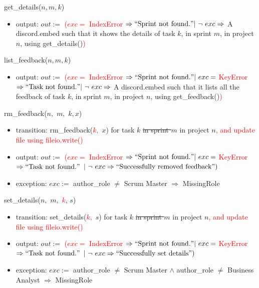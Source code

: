 \documentclass[12pt, titlepage]{article}
\begin{document}
\noindent get\_details($n, m, k$)
\begin{itemize}
    \item output: $out :=$ \textcolor{red}{($exc =$ IndexError $\Rightarrow ``\text{Sprint not found.}"\\ |\ \lnot\ exc \Rightarrow$} A discord.embed such that it shows the details of task $k$, in sprint $m$, in project $n$, using get\_details()\textcolor{red}{)}
\end{itemize}

\noindent list\_feedback($n, m, k$)
\begin{itemize}
    \item output: $out :=$ \textcolor{red}{($exc =$ IndexError $\Rightarrow ``\text{Sprint not found.}"\\ |\ exc =$ KeyError $\Rightarrow ``\text{Task not found.}"\\ |\ \lnot\ exc \Rightarrow$} A discord.embed such that it lists all the feedback of task $k$, in sprint $m$, in project $n$, using get\_feedback()\textcolor{red}{)}
\end{itemize}

\noindent rm\_feedback($n,$ \sout{$m,$} $k, x$)
\begin{itemize}
    \item transition: rm\_feedback(\textcolor{red}{$k,$} $x$) for task $k$ \sout{in sprint $m$} in project $n$\textcolor{red}{, and update file using fileio.write()}
    \item output: $out :=$ \textcolor{red}{($exc =$ IndexError $\Rightarrow ``\text{Sprint not found.}"\\ |\ exc =$ KeyError $\Rightarrow ``\text{Task not found.}"$} $\\ |\ \lnot\ exc \Rightarrow ``\text{Successfully removed feedback}")$
    \item exception: $exc :=$ author\_role $\neq$ Scrum Master $\Rightarrow$ MissingRole
\end{itemize}

\noindent set\_details($n,$ \sout{$m,$} \textcolor{red}{$k$}, $s$)
\begin{itemize}
    \item transition: set\_details(\textcolor{red}{$k,$} $s$) for task $k$ \sout{in sprint $m$} in project $n$\textcolor{red}{, and update file using fileio.write()}
    
    \item output: $out :=$ \textcolor{red}{($exc =$ IndexError $\Rightarrow ``\text{Sprint not found.}"\\ |\ exc =$ KeyError $\Rightarrow ``\text{Task not found.}"$} $\\ |\ \lnot\ exc \Rightarrow ``\text{Successfully set details}")$
    
    \item exception: $exc :=$ author\_role $\neq$ Scrum Master $\land$ author\_role $\neq$ Business Analyst $\Rightarrow$ MissingRole
\end{itemize}
\end{document}
